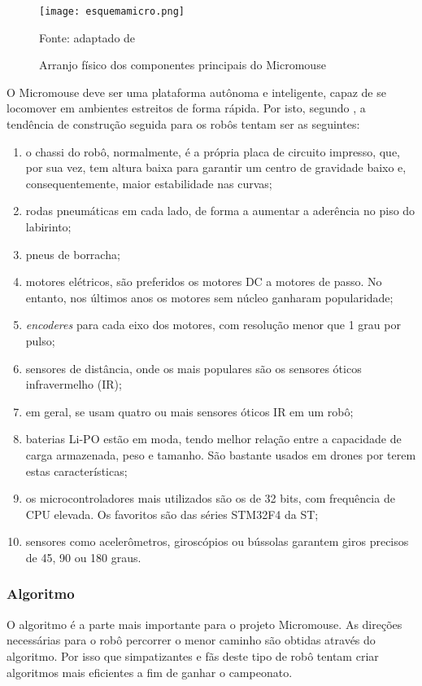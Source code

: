 \begin{figure}[!htb]
	\caption{\label{fig:arranjo}Arranjo físico dos componentes principais do Micromouse}
	\begin{center}
		\texttt{[image: esquemamicro.png]}
	\end{center}
	\centering
	\small Fonte: adaptado de 
\end{figure}

O Micromouse deve ser uma plataforma autônoma e inteligente, capaz de se locomover em ambientes estreitos de forma rápida. Por isto, segundo , a tendência de construção seguida para os robôs tentam ser as seguintes:

\begin{enumerate}[leftmargin=2cm,label=\alph*)]
	\item o chassi do robô, normalmente, é a própria placa de circuito impresso, que, por sua vez, tem altura baixa para garantir um centro de gravidade baixo e, consequentemente, maior estabilidade nas curvas;
	\item rodas pneumáticas em cada lado, de forma a aumentar a aderência no piso do labirinto;
	\item pneus de borracha;
	\item motores elétricos, são preferidos os motores DC a motores de passo. No entanto, nos últimos anos os motores sem núcleo ganharam popularidade;
	\item \textit{encoderes} para cada eixo dos motores, com resolução menor que 1 grau por pulso;
	\item sensores de distância, onde os mais populares são os sensores óticos infravermelho (IR);
	\item em geral, se usam quatro ou mais sensores óticos IR em um robô;
	\item baterias Li-PO estão em moda, tendo melhor relação entre a capacidade de carga armazenada, peso e tamanho. São bastante usados em drones por terem estas características;
	\item os microcontroladores mais utilizados são os de 32 bits, com frequência de CPU elevada. Os favoritos são das séries STM32F4 da ST;
	\item sensores como acelerômetros, giroscópios ou bússolas garantem giros precisos de 45, 90 ou 180 graus.
\end{enumerate}

\subsubsection{Algoritmo}
O algoritmo é a parte mais importante para o projeto Micromouse. As direções necessárias para o robô percorrer o menor caminho são obtidas através do algoritmo. Por isso que simpatizantes e fãs deste tipo de robô tentam criar algoritmos mais eficientes a fim de ganhar o campeonato.

